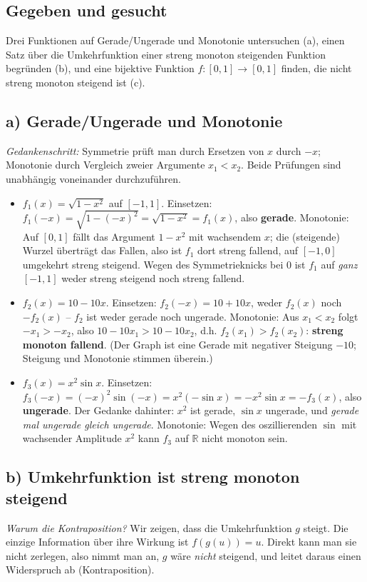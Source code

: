 
\subsection*{Gegeben und gesucht}
Drei Funktionen auf Gerade/Ungerade und Monotonie untersuchen (a), einen
Satz über die Umkehrfunktion einer streng monoton steigenden Funktion
begründen (b), und eine bijektive Funktion $f\colon[0,1]\to[0,1]$ finden,
die nicht streng monoton steigend ist (c).

\subsection*{a) Gerade/Ungerade und Monotonie}
\emph{Gedankenschritt:} Symmetrie prüft man durch Ersetzen von $x$ durch
$-x$; Monotonie durch Vergleich zweier Argumente $x_1<x_2$. Beide Prüfungen
sind unabhängig voneinander durchzuführen.

\begin{itemize}
  \item $f_1(x)=\sqrt{1-x^2}$ auf $[-1,1]$. Einsetzen:
        $f_1(-x)=\sqrt{1-(-x)^2}=\sqrt{1-x^2}=f_1(x)$, also \textbf{gerade}.
        Monotonie: Auf $[0,1]$ fällt das Argument $1-x^2$ mit wachsendem $x$;
        die (steigende) Wurzel überträgt das Fallen, also ist $f_1$ dort
        streng fallend, auf $[-1,0]$ umgekehrt streng steigend. Wegen des
        Symmetrieknicks bei $0$ ist $f_1$ auf \emph{ganz} $[-1,1]$ weder
        streng steigend noch streng fallend.
  \item $f_2(x)=10-10x$. Einsetzen: $f_2(-x)=10+10x$, weder $f_2(x)$ noch
        $-f_2(x)$ -- $f_2$ ist weder gerade noch ungerade. Monotonie: Aus
        $x_1<x_2$ folgt $-x_1>-x_2$, also $10-10x_1>10-10x_2$, d.h.
        $f_2(x_1)>f_2(x_2)$: \textbf{streng monoton fallend}. (Der Graph ist
        eine Gerade mit negativer Steigung $-10$; Steigung und Monotonie
        stimmen überein.)
  \item $f_3(x)=x^2\sin x$. Einsetzen:
        $f_3(-x)=(-x)^2\sin(-x)=x^2(-\sin x)=-x^2\sin x=-f_3(x)$, also
        \textbf{ungerade}. Der Gedanke dahinter: $x^2$ ist gerade, $\sin x$
        ungerade, und \emph{gerade mal ungerade gleich ungerade}. Monotonie: Wegen
        des oszillierenden $\sin$ mit wachsender Amplitude $x^2$ kann $f_3$
        auf $\mathbb R$ nicht monoton sein.
\end{itemize}

\subsection*{b) Umkehrfunktion ist streng monoton steigend}
\emph{Warum die Kontraposition?} Wir zeigen, dass die Umkehrfunktion $g$
steigt. Die einzige Information über ihre Wirkung ist $f(g(u))=u$. Direkt
kann man sie nicht zerlegen, also nimmt man an, $g$ wäre \emph{nicht}
steigend, und leitet daraus einen Widerspruch ab (Kontraposition).

